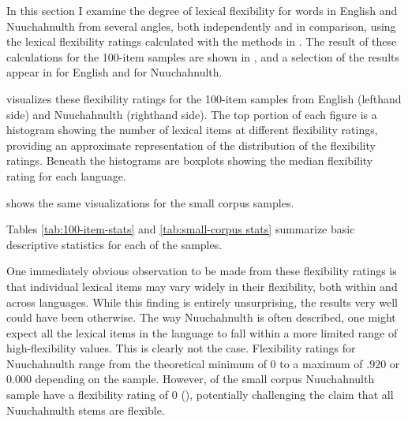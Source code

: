 In this section I examine the degree of lexical flexibility for words in English and Nuuchahnulth from several angles, both independently and in comparison, using the lexical flexibility ratings calculated with the methods in . The result of these calculations for the 100-item samples are shown in , and a selection of the results appear in  for English and  for Nuuchahnulth.



 visualizes these flexibility ratings for the 100-item samples from English (lefthand side) and Nuuchahnulth (righthand side). The top portion of each figure is a histogram showing the number of lexical items at different flexibility ratings, providing an approximate representation of the distribution of the flexibility ratings. Beneath the histograms are boxplots showing the median flexibility rating for each language.


\noindent {} shows the same visualizations for the small corpus samples.


\noindent Tables \ref{tab:100-item-stats} and \ref{tab:small-corpus stats} summarize basic descriptive statistics for each of the samples.


One immediately obvious observation to be made from these flexibility ratings is that individual lexical items may vary widely in their flexibility, both within and across languages. While this finding is entirely unsurprising, the results very well could have been otherwise. The way Nuuchahnulth is often described, one might expect all the lexical items in the language to fall within a more limited range of high-flexibility values. This is clearly not the case. Flexibility ratings for Nuuchahnulth range from the theoretical minimum of $0$ to a maximum of $.920$ or $0.000$ depending on the sample. However,  of the small corpus Nuuchahnulth sample have a flexibility rating of $0$ (), potentially challenging the claim that all Nuuchahnulth stems are flexible.

